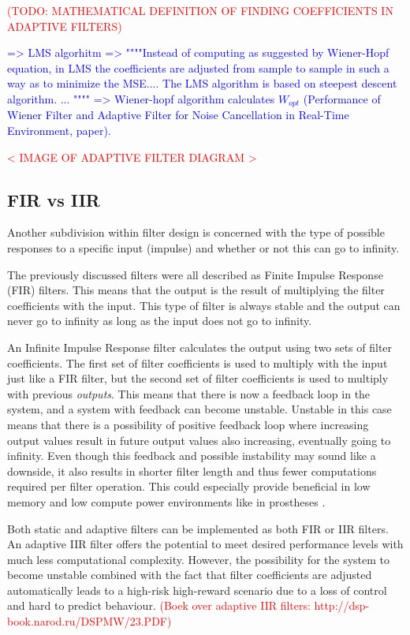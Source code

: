 \textcolor{red}{(TODO: MATHEMATICAL DEFINITION OF FINDING COEFFICIENTS IN ADAPTIVE FILTERS) }

\textcolor{blue}{
=> LMS algorhitm
=> """"Instead of computing as suggested by
Wiener-Hopf equation, in LMS the coefficients are adjusted
from sample to sample in such a way as to minimize the MSE.... The LMS algorithm is based on steepest descent algorithm. ... """" => Wiener-hopf algorithm calculates $W_{opt}$ (Performance of Wiener Filter and Adaptive Filter for Noise Cancellation in Real-Time Environment, paper).}

\textcolor{red}{< IMAGE OF ADAPTIVE FILTER DIAGRAM >}

\subsection{FIR vs IIR}
Another subdivision within filter design is concerned with the type of possible responses to a specific input (impulse) and whether or not this can go to infinity.

The previously discussed filters were all described as Finite Impulse Response (FIR) filters. This means that the output is the result of multiplying the filter coefficients with the input. This type of filter is always stable and the output can never go to infinity as long as the input does not go to infinity.

An Infinite Impulse Response filter calculates the output using two sets of filter coefficients. The first set of filter coefficients is used to multiply with the input just like a FIR filter, but the second set of filter coefficients is used to multiply with previous \textit{outputs}. This means that there is now a feedback loop in the system, and a system with feedback can become unstable. Unstable in this case means that there is a possibility of positive feedback loop where increasing output values result in future output values also increasing, eventually going to infinity. Even though this feedback and possible instability may sound like a downside, it also results in shorter filter length and thus fewer computations required per filter operation. This could especially provide beneficial in low memory and low compute power environments like in prostheses \cite{fir_vs_iir}.

Both static and adaptive filters can be implemented as both FIR or IIR filters. An adaptive IIR filter offers the potential to meet desired performance levels with much less computational complexity. However, the possibility for the system to become unstable combined with the fact that filter coefficients are adjusted automatically leads to a high-risk high-reward scenario due to a loss of control and hard to predict behaviour.  \textcolor{red}{(Boek over adaptive IIR filters: http://dsp-book.narod.ru/DSPMW/23.PDF)}


